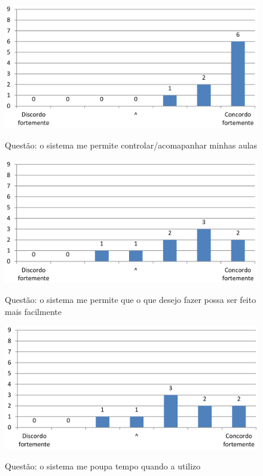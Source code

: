 \begin{figure}[ht]
\centering
\caption{Questão: o sistema me permite controlar/acomapanhar minhas aulas}
\includegraphics[width=1.0\textwidth]{use/controlar_aula.pdf} 
\label{fig:permite_controlar} 
\end{figure}



\begin{figure}[ht]
\centering
\caption{Questão: o sistema me permite que o que desejo fazer possa ser feito mais facilmente}
\includegraphics[width=1.0\textwidth]{use/mais_facilmente.pdf} 
\label{fig:mais_facilmente} 
\end{figure}


\begin{figure}[ht]
\centering
\caption{Questão: o sistema me poupa tempo quando a utilizo}
\includegraphics[width=1.0\textwidth]{use/poupa_tempo.pdf} 
\label{fig:poupa_tempo} 
\end{figure}


